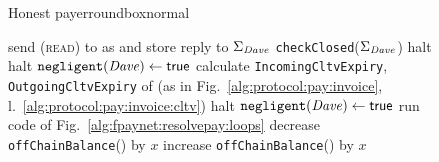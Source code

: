   \begin{figure}[H]
    \begin{titlebox}{\normalfont Honest payer}{roundbox}{normal}
      \begin{algorithmic}[1]
        \State send (\textsc{read}) to \ledger{} as \dave{} and store reply to
        $\Sigma_{\mathit{Dave}}$
        \State \texttt{checkClosed}($\Sigma_{\mathit{Dave}}$)
        \label{alg:fpaynet:resolvepay:haltcond:ds}
          \State halt 
          \label{alg:fpaynet:resolvepay:halt:ds}
          \label{alg:fpaynet:resolvepay:haltcond:rel}
            \State halt 
            \label{alg:fpaynet:resolvepay:halt:rel}
          \Else
            \State $\mathtt{negligent}(\mathit{Dave}) \gets \mathsf{true}$
          \EndIf
        \ElsIf{$\dave{} \neq \alice$}
          \State calculate \texttt{IncomingCltvExpiry},
          \texttt{OutgoingCltvExpiry} of \dave{} (as in
          Fig.~\ref{alg:protocol:pay:invoice},
          l.~\ref{alg:protocol:pay:invoice:cltv})
              \State halt 
              \label{alg:fpaynet:resolvepay:halt:abs}
            \Else
              \State $\mathtt{negligent}(\mathit{Dave}) \gets \mathsf{true}$
            \EndIf
          \EndIf
        \EndIf
        \State run code of Fig.~\ref{alg:fpaynet:resolvepay:loops}
        \label{alg:fpaynet:resolvepay:honest:gotoloops}
        \State decrease \texttt{offChainBalance}(\dave) by $x$
        \label{alg:fpaynet:resolvepay:debit}
        \State increase \texttt{offChainBalance}(\bob) by $x$
        \label{alg:fpaynet:resolvepay:credit}
      \end{algorithmic}
    \end{titlebox}
    \caption{}
    \label{alg:fpaynet:resolvepay:honestpayer}
  \end{figure}

